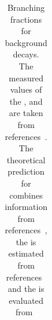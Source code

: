 \begin{table}[htbp]
\begin{center}
\begin{tabular}{lr}
\end{tabular}
\vspace{0.7cm}
\caption{Branching fractions for background decays. The measured values of the \bhh, \bdpimunu \lambdab and \bupimumu \BFs are taken from references~\cite{Olive:2016xmw,Aaij:2015bfa, Aaij:2015nea}. The theoretical prediction for \bsKmunu \BF combines information from references~\cite{Bouchard:2014ypa,PhysRevD.91.074510}, the \bcjpsimunu \BF is estimated from references~\cite{Aaij:2012dd,Aaij:2014jxa} and the \bupimumu \BFs is evaluated from~\cite{Aaij:2015nea,Wang:2012ab}   }
\label{tab:backgroundBFs}
\end{center}
\vspace{-1.0cm}
\end{table}




